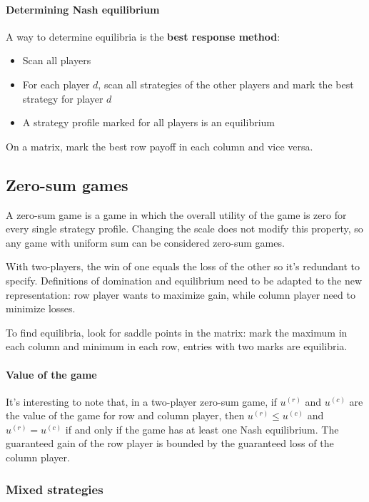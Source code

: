 \paragraph{Determining Nash equilibrium} A way to determine equilibria is the \textbf{best response method}: 
\begin{itemize}
	\item Scan all players
	
	\item For each player $d$, scan all strategies of the other players and mark the best strategy for player $d$
	
	\item A strategy profile marked for all players is an equilibrium
\end{itemize}

On a matrix, mark the best row payoff in each column and vice versa. 

\subsection{Zero-sum games}

A zero-sum game is a game in which the overall utility of the game is zero for every single strategy profile. Changing the scale does not modify this property, so any game with uniform sum can be considered zero-sum games. 

With two-players, the win of one equals the loss of the other so it's redundant to specify. Definitions of domination and equilibrium need to be adapted to the new representation: row player wants to maximize gain, while column player need to minimize losses. 

To find equilibria, look for saddle points in the matrix: mark the maximum in each column and minimum in each row, entries with two marks are equilibria.

\paragraph{Value of the game} It's interesting to note that, in a two-player zero-sum game, if $u^{(r)}$ and $u^{(c)}$ are the value of the game for row and column player, then $u^{(r)} \leq u^{(c)}$ and $u^{(r)} = u^{(c)}$ if and only if the game has at least one Nash equilibrium. The guaranteed gain of the row player is bounded by the guaranteed loss of the column player.

\subsubsection{Mixed strategies}


